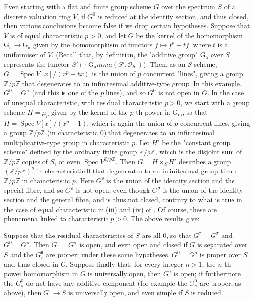 \begin{remark}
    Even starting with a flat and finite group scheme $G$ over the spectrum $S$ of a discrete valuation ring $V$, if $G^0$ is reduced at the identity section, and thus closed, then various conclusions become false if we drop certain hypotheses.
    Suppose that $V$ is of equal characteristic $p>0$, and let $G$ be the kernel of the homomorphism $\operatorname{G_a}\to\operatorname{G_a}$ given by the homomorphism of functors $f\mapsto f^p-tf$, where $t$ is a uniformiser of $V$.
    (Recall that, by definition, the "additive group" $\operatorname{G_a}$ over $S$ represents the functor $S'\mapsto\operatorname{G_a}mma(S',\mathcal{O}_{S'})$).
    Then, as an $S$-scheme, $G=\operatorname{Spec} V[x]/(x^p-tx)$ is the union of $p$ concurrent "lines", giving a group $\mathbb{Z}/p\mathbb{Z}$ that degenerates to an infinitesimal additive-type group.
    In this example, $G^0=G^\sigma$ (and this is one of the $p$ lines), and so $G^0$ is not open in $G$.
    In the case of unequal characteristic, with residual characteristic $p>0$, we start with a group scheme $H=\mu_p$ given by the kernel of the $p$-th power in $\operatorname{G_m}$, so that $H=\operatorname{Spec} V[x]/(x^p-1)$, which is again the union of $p$ concurrent lines, giving a group $\mathbb{Z}/p\mathbb{Z}$ (in characteristic $0$) that degenerates to an infinitesimal multiplicative-type group in characteristic $p$.
    Let $H'$ be the "constant group scheme" defined by the ordinary finite group $\mathbb{Z}/p\mathbb{Z}$, which is the disjoint sum of $\mathbb{Z}/p\mathbb{Z}$ copies of $S$, or even $\operatorname{Spec} V^{\mathbb{Z}/p\mathbb{Z}}$.
    Then $G=H\times_S H'$ describes a group $(\mathbb{Z}/p\mathbb{Z})^2$ in characteristic $0$ that degenerates to an infinitesimal group times $\mathbb{Z}/p\mathbb{Z}$ in characteristic $p$.
    Here $G^\rho$ is the union of the identity section and the special fibre, and so $G^\rho$ is not open, even though $G^\sigma$ is the union of the identity section and the general fibre, and is thus not closed, contrary to what is true in the case of equal characteristic in (iii) and (iv) of .
    Of course, these are phenomena linked to characteristic $p>0$.
    The above results give:
\end{remark}

\begin{corollary}\label{fga3.vi-1-corollary-1.10}
    Suppose that the residual characteristics of $S$ are all $0$, so that $G^\tau=G^\sigma$ and $G^0=G^\rho$.
    Then $G^\tau=G^\sigma$ is open, and even open and closed if $G$ is separated over $S$ and the $G_s^0$ are proper;
    under these same hypotheses, $G^0=G^\rho$ is proper over $S$ and thus closed in $G$.
    Suppose finally that, for every integer $n>1$, the $n$-th power homomorphism in $G$ is universally open, then $G^0$ is open;
    if furthermore the $G_s^0$ do not have any additive component (for example the $G_s^0$ are proper, as above), then $G^\tau\to S$ is universally open, and even simple if $S$ is reduced.
\end{corollary}

